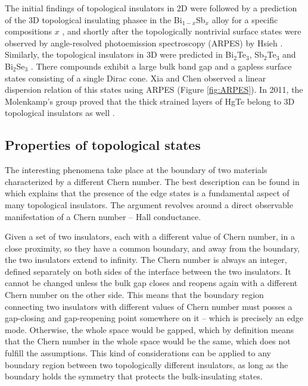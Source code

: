 \documentclass[titlepage,a4paper]{book}
\newcommand{\wciecie}{\quad\phantom{v}}
\begin{document}
The initial findings of topological insulators in 2D were followed by a prediction of the 3D topological insulating phasee in the Bi$_{1-x}$Sb$_x$ alloy for a specific compositions $x$ \cite{Fu_Topology}, and shortly after the topologically nontrivial surface states were observed by angle-resolved photoemission spectroscopy (ARPES) by Hsieh \cite{Hsieh}. Similarly, the topological insulators in 3D were predicted in Bi$_2$Te$_3$, Sb$_2$Te$_3$ \cite{Zhang_Topology} and Bi$_2$Se$_3$ \cite{Zhang_Topology}\cite{Xia_Topology}. There compounds exhibit a large bulk band gap and a gapless surface states consisting of a single Dirac cone. Xia \cite{Xia_Topology} and Chen \cite{Chen_Topology} observed a linear dispersion relation of this states using ARPES (Figure \ref{fig:ARPES}). In 2011, the Molenkamp's group proved that the thick strained layers of HgTe belong to 3D topological insulators as well \cite{Brune_State2}.



\subsection{Properties of topological states}
\wciecie
The interesting phenomena take place at the boundary of two materials characterized by a different Chern number. The best description can be found in \cite{Bernevig_book} which explains that the presence of the edge states is a fundamental aspect of many topological insulators. The argument revolves around a direct observable manifestation of a Chern number -- Hall conductance.

Given a set of two insulators, each with a different value of Chern number, in a close proximity, so they have a common boundary, and away from the boundary, the two insulators extend to infinity. The Chern number is always an integer, defined separately on both sides of the interface between the two insulators. It cannot be changed unless the bulk gap closes and reopens again with a different Chern number on the other side. This means that the boundary region connecting two insulators with different values of Chern number must posses a gap-closing and gap-reopening point somewhere on it -- which is precisely an edge mode. Otherwise, the whole space would be gapped, which by definition means that the Chern number in the whole space would be the same, which does not fulfill the assumptions. This kind of considerations can be applied to any boundary region between two topologically different insulators, as long as the boundary holds the symmetry that protects the bulk-insulating states. 
\end{document}
